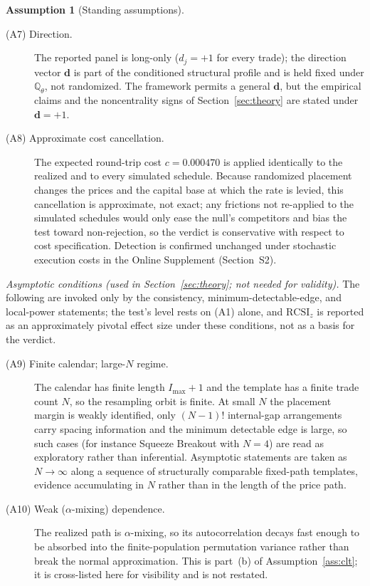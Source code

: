 \documentclass[preprint,12pt]{elsarticle}
\theoremstyle{definition}
\newtheorem{assumption}{Assumption}
\begin{document}
\begin{assumption}[Standing assumptions]
\begin{description}
\item[(A7) Direction.] The reported panel is long-only ($d_j=+1$ for every
trade); the direction vector $\mathbf d$ is part of the conditioned structural
profile and is held fixed under $\mathbb{Q}_\theta$, not randomized. The
framework permits a general $\mathbf d$, but the empirical claims and the
noncentrality signs of Section~\ref{sec:theory} are stated under $\mathbf d=+1$.

\item[(A8) Approximate cost cancellation.] The expected round-trip cost
$c=0.000470$ is applied identically to the realized and to every simulated
schedule. Because randomized placement changes the prices and the capital base
at which the rate is levied, this cancellation is approximate, not exact; any
frictions not re-applied to the simulated schedules would only ease the null's
competitors and bias the test toward non-rejection, so the verdict is
conservative with respect to cost specification. Detection is confirmed
unchanged under stochastic execution costs in the Online Supplement
(Section~S2).
\end{description}

\medskip
\noindent\emph{Asymptotic conditions (used in Section~\ref{sec:theory}; not
needed for validity).} The following are invoked only by the consistency,
minimum-detectable-edge, and local-power statements; the test's level rests on
(A1) alone, and $\mathrm{RCSI}_z$ is reported as an approximately pivotal
effect size under these conditions, not as a basis for the verdict.

\begin{description}
\item[(A9) Finite calendar; large-$N$ regime.] The calendar has finite length
$I_{\max}+1$ and the template has a finite trade count $N$, so the resampling
orbit is finite. At small $N$ the placement margin is weakly identified, only $(N-1)!$ internal-gap
arrangements carry spacing information and the minimum detectable edge is large, so such
cases (for instance Squeeze Breakout with $N=4$) are read as exploratory rather than
inferential.
Asymptotic statements are taken as $N\to\infty$ along a sequence of structurally
comparable fixed-path templates, evidence accumulating in $N$ rather than in
the length of the price path.

\item[(A10) Weak ($\alpha$-mixing) dependence.] The realized path is
$\alpha$-mixing, so its autocorrelation decays fast enough to be absorbed into
the finite-population permutation variance rather than break the normal
approximation. This is part~(b) of Assumption~\ref{ass:clt}; it is cross-listed
here for visibility and is not restated.


\end{description}
\end{assumption}
\end{document}
